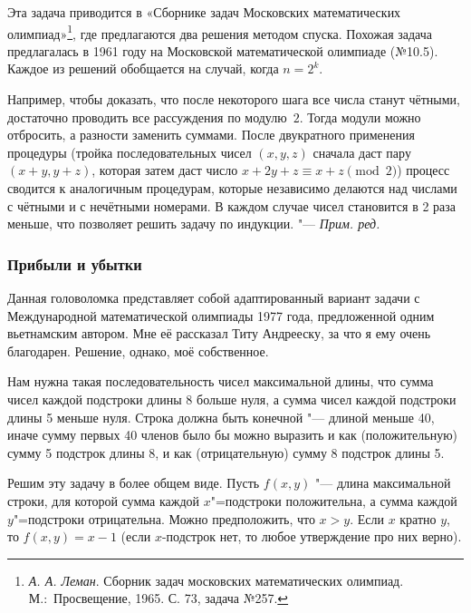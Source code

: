 \documentclass[twoside]{book}
\newenvironment{addedbytheeditors}{\par\medskip\small
}{\par\addvspace{\medskipamount}} %
\begin{document}
\begin{addedbytheeditors}
Эта задача приводится в «Сборнике задач Московских математических олимпиад»\footnote{%
\emph{А. А. Леман}. Сборник задач московских математических олимпиад. М.:~Просвещение, 1965. С. 73, задача №257.}, где предлагаются два решения методом спуска.
Похожая задача предлагалась в 1961 году на Московской математической олимпиаде (№10.5). 
Каждое из решений обобщается на случай, когда $n=2^k$.

Например, чтобы доказать, что после некоторого шага все числа станут чётными, достаточно проводить все рассуждения по модулю~$2$.
Тогда модули можно отбросить, а разности  заменить суммами.
После двукратного применения процедуры (тройка последовательных чисел $(x,y,z)$ сначала даст пару $(x+y,y+z)$, которая затем даст число $x+2y+z\equiv x+z \pmod{2}$) процесс сводится к аналогичным  процедурам, которые независимо делаются над числами с чётными и с нечётными номерами. В каждом случае чисел становится в 2 раза меньше, что позволяет решить задачу по индукции.
"--- \emph{Прим. ред.}
\end{addedbytheeditors}


\subsubsection*{Прибыли и убытки}%

Данная головоломка представляет собой адаптированный вариант задачи с Международной математической олимпиады 1977 года,
предложенной одним вьетнамским автором.
Мне её рассказал Титу Андрееску, %
за что я ему очень благодарен.
Решение, однако, моё собственное.

\medskip

Нам нужна такая последовательность чисел
максимальной длины, что сумма чисел каждой подстроки длины 8 больше нуля, а сумма чисел каждой подстроки длины 5 меньше нуля.
Строка должна быть конечной "--- длиной меньше
40, иначе  сумму первых 40 членов было бы можно выразить и как (положительную) сумму 5 подстрок длины 8, и как (отрицательную) сумму 8 подстрок длины 5.

Решим эту задачу в более общем виде.
Пусть $f(x,y)$ "---
длина максимальной строки, для которой сумма каждой $x$"=подстроки
положительна, а сумма каждой $y$"=подстроки отрицательна.
Можно
предположить, что $x>y$.
Если $x$ кратно $y$, то $f(x,y)=x-1$
(если $x$-подстрок нет, то любое утверждение про них верно).
\end{document}
